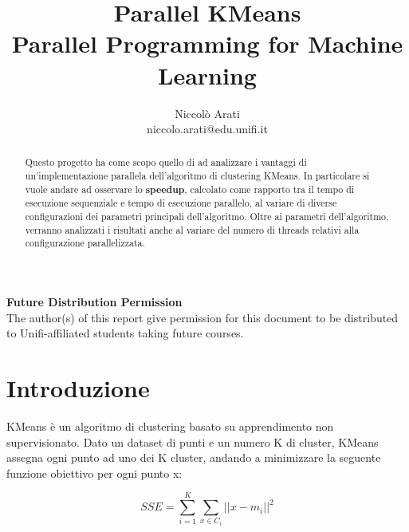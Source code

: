 \documentclass[10pt,twocolumn,letterpaper]{article}
\begin{document}
\title{Parallel KMeans\\
\large Parallel Programming for Machine Learning}

\author{Niccolò Arati\\
niccolo.arati@edu.unifi.it\\
}

\maketitle
\thispagestyle{empty}

\begin{abstract}
   Questo progetto ha come scopo quello di ad analizzare i vantaggi di un'implementazione parallela dell'algoritmo di clustering KMeans. In particolare si vuole andare ad osservare lo \textbf{speedup}, calcolato come rapporto tra il tempo di esecuzione sequenziale e tempo di esecuzione parallelo, al variare di diverse configurazioni dei parametri principali dell'algoritmo. Oltre ai parametri dell'algoritmo, verranno analizzati i risultati anche al variare del numero di threads relativi alla configurazione parallelizzata.
\end{abstract}

\noindent\large\textbf{Future Distribution Permission}\\
\indent The author(s) of this report give permission for this document to be distributed to Unifi-affiliated students taking future courses.


\section{Introduzione}
\label{sec:intro}
KMeans è un algoritmo di clustering basato su apprendimento non supervisionato. Dato un dataset di punti e un numero K di cluster, KMeans assegna ogni punto ad uno dei K cluster, andando a minimizzare la seguente funzione obiettivo per ogni punto x:

\begin{equation}
    \label{eq:sse}
    SSE = \sum_{i = 1}^K \sum_{x \in C_i} \lvert \lvert x - m_i \rvert \rvert^2
\end{equation}
\end{document}
